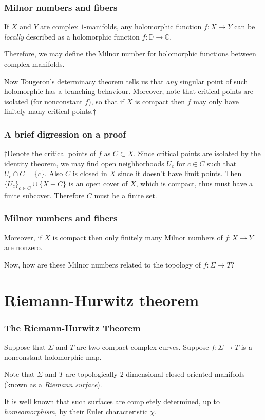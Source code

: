 \documentclass{beamer}
\begin{document}
\begin{frame}
\frametitle{Milnor numbers and fibers}

If $X$ and $Y$ are complex $1$-manifolds, any holomorphic function $f:X \to Y$ can be \textit{locally} described as a holomorphic function $f:\mathbb{D} \to \mathbb{C}$.

\phantom{?}

Therefore, we may define the Milnor number for holomorphic functions between complex manifolds.

\phantom{?}

Now Tougeron's determinacy theorem tells us that \textit{any} singular point of such holomorphic has a branching behaviour. Moreover, note that critical points are isolated (for nonconstant $f$), so that if $X$ is compact then $f$ may only have finitely many critical points.$\dagger$

\end{frame}


\begin{frame}
\frametitle{A brief digression on a proof}

$\dagger$Denote the critical points of $f$ as $C \subset X$. Since critical points are isolated by the identity theorem, we may find open neighborhoods $U_c$ for $c \in C$ such that $U_c \cap C = \{c\}$. Also $C$ is closed in $X$ since it doesn't have limit points. Then $\{U_c\}_{c\in C} \cup \{X-C\}$ is an open cover of $X$, which is compact, thus must have a finite subcover. Therefore $C$ must be a finite set.

\end{frame}


\begin{frame}
\frametitle{Milnor numbers and fibers}

Moreover, if $X$ is compact then only finitely many Milnor numbers of $f : X \to Y$ are nonzero.

\phantom{?}

Now, how are these Milnor numbers related to the topology of $f: \Sigma \to T$?

\end{frame}

\section{Riemann-Hurwitz theorem}

\begin{frame}
\frametitle{The Riemann-Hurwitz Theorem}

Suppose that $\Sigma$ and $T$ are two compact complex curves. Suppose $f : \Sigma \to T$ is a nonconstant holomorphic map.

\phantom{?}

Note that $\Sigma$ and $T$ are topologically 2-dimensional closed oriented manifolds (known as a \textit{Riemann surface}).

\phantom{?}

It is well known that such surfaces are completely determined, up to \textit{homeomorphism}, by their Euler characteristic $\chi$.

\end{frame}
\end{document}
